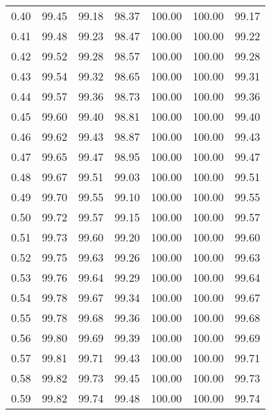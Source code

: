 \begin{tabular}{|c|c|c|c|c|c|c|}
      0.40 &     99.45 &     99.18 &      98.37 &  100.00 &     100.00 &         99.17 \\
      0.41 &     99.48 &     99.23 &      98.47 &  100.00 &     100.00 &         99.22 \\
      0.42 &     99.52 &     99.28 &      98.57 &  100.00 &     100.00 &         99.28 \\
      0.43 &     99.54 &     99.32 &      98.65 &  100.00 &     100.00 &         99.31 \\
      0.44 &     99.57 &     99.36 &      98.73 &  100.00 &     100.00 &         99.36 \\
      0.45 &     99.60 &     99.40 &      98.81 &  100.00 &     100.00 &         99.40 \\
      0.46 &     99.62 &     99.43 &      98.87 &  100.00 &     100.00 &         99.43 \\
      0.47 &     99.65 &     99.47 &      98.95 &  100.00 &     100.00 &         99.47 \\
      0.48 &     99.67 &     99.51 &      99.03 &  100.00 &     100.00 &         99.51 \\
      0.49 &     99.70 &     99.55 &      99.10 &  100.00 &     100.00 &         99.55 \\
      0.50 &     99.72 &     99.57 &      99.15 &  100.00 &     100.00 &         99.57 \\
      0.51 &     99.73 &     99.60 &      99.20 &  100.00 &     100.00 &         99.60 \\
      0.52 &     99.75 &     99.63 &      99.26 &  100.00 &     100.00 &         99.63 \\
      0.53 &     99.76 &     99.64 &      99.29 &  100.00 &     100.00 &         99.64 \\
      0.54 &     99.78 &     99.67 &      99.34 &  100.00 &     100.00 &         99.67 \\
      0.55 &     99.78 &     99.68 &      99.36 &  100.00 &     100.00 &         99.68 \\
      0.56 &     99.80 &     99.69 &      99.39 &  100.00 &     100.00 &         99.69 \\
      0.57 &     99.81 &     99.71 &      99.43 &  100.00 &     100.00 &         99.71 \\
      0.58 &     99.82 &     99.73 &      99.45 &  100.00 &     100.00 &         99.73 \\
      0.59 &     99.82 &     99.74 &      99.48 &  100.00 &     100.00 &         99.74 \\

\end{tabular}
